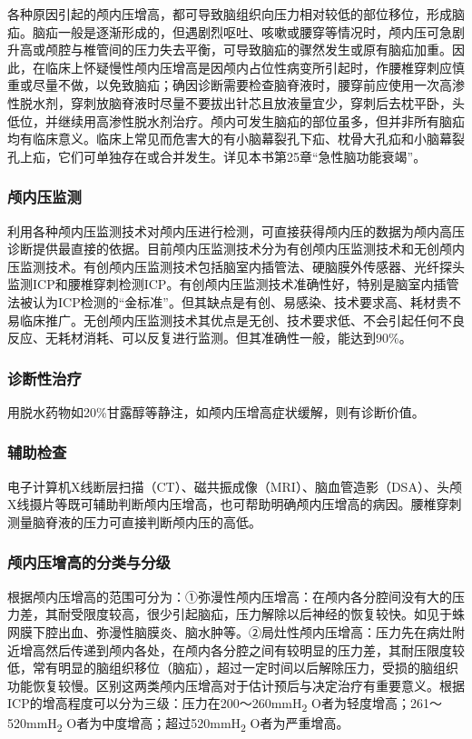 各种原因引起的颅内压增高，都可导致脑组织向压力相对较低的部位移位，形成脑疝。脑疝一般是逐渐形成的，但遇剧烈呕吐、咳嗽或腰穿等情况时，颅内压可急剧升高或颅腔与椎管间的压力失去平衡，可导致脑疝的骤然发生或原有脑疝加重。因此，在临床上怀疑慢性颅内压增高是因颅内占位性病变所引起时，作腰椎穿刺应慎重或尽量不做，以免致脑疝；确因诊断需要检查脑脊液时，腰穿前应使用一次高渗性脱水剂，穿刺放脑脊液时尽量不要拔出针芯且放液量宜少，穿刺后去枕平卧，头低位，并继续用高渗性脱水剂治疗。颅内可发生脑疝的部位虽多，但并非所有脑疝均有临床意义。临床上常见而危害大的有小脑幕裂孔下疝、枕骨大孔疝和小脑幕裂孔上疝，它们可单独存在或合并发生。详见本书第25章“急性脑功能衰竭”。

\subsubsection{颅内压监测}

利用各种颅内压监测技术对颅内压进行检测，可直接获得颅内压的数据为颅内高压诊断提供最直接的依据。目前颅内压监测技术分为有创颅内压监测技术和无创颅内压监测技术。有创颅内压监测技术包括脑室内插管法、硬脑膜外传感器、光纤探头监测ICP和腰椎穿刺检测ICP。有创颅内压监测技术准确性好，特别是脑室内插管法被认为ICP检测的“金标准”。但其缺点是有创、易感染、技术要求高、耗材贵不易临床推广。无创颅内压监测技术其优点是无创、技术要求低、不会引起任何不良反应、无耗材消耗、可以反复进行监测。但其准确性一般，能达到90\%。

\subsubsection{诊断性治疗}

用脱水药物如20\%甘露醇等静注，如颅内压增高症状缓解，则有诊断价值。

\subsubsection{辅助检查}

电子计算机X线断层扫描（CT）、磁共振成像（MRI）、脑血管造影（DSA）、头颅X线摄片等既可辅助判断颅内压增高，也可帮助明确颅内压增高的病因。腰椎穿刺测量脑脊液的压力可直接判断颅内压的高低。

\subsubsection{颅内压增高的分类与分级}

根据颅内压增高的范围可分为：①弥漫性颅内压增高：在颅内各分腔间没有大的压力差，其耐受限度较高，很少引起脑疝，压力解除以后神经的恢复较快。如见于蛛网膜下腔出血、弥漫性脑膜炎、脑水肿等。②局灶性颅内压增高：压力先在病灶附近增高然后传递到颅内各处，在颅内各分腔之间有较明显的压力差，其耐压限度较低，常有明显的脑组织移位（脑疝），超过一定时间以后解除压力，受损的脑组织功能恢复较慢。区别这两类颅内压增高对于估计预后与决定治疗有重要意义。根据ICP的增高程度可以分为三级：压力在200～260mmH\textsubscript{2}
O者为轻度增高；261～520mmH\textsubscript{2}
O者为中度增高；超过520mmH\textsubscript{2} O者为严重增高。

